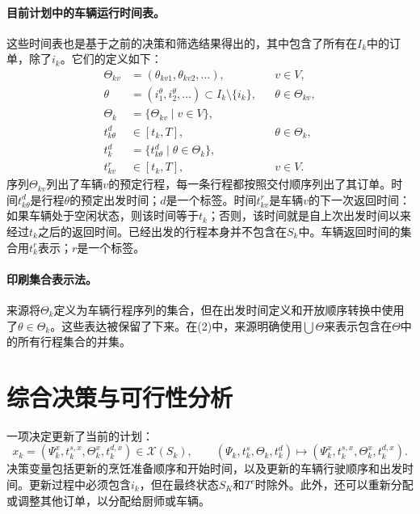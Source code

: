 \documentclass{article}
\begin{document}
\paragraph{目前计划中的车辆运行时间表。}
这些时间表也是基于之前的决策和筛选结果得出的，其中包含了所有在\(I_k\)中的订单，除了\(i_k\)。它们的定义如下：
\begin{align*}
\Theta_{kv}&=(\theta_{kv1},\theta_{kv2},\ldots), &&v\in V,\\
\theta&=(i^\theta_1,i^\theta_2,\ldots)\subset I_k\setminus\{i_k\}, &&\theta\in\Theta_{kv},\\
\Theta_k&=\{\Theta_{kv}\mid v\in V\},\\
t^d_{k\theta}&\in[t_k,T], &&\theta\in\Theta_k,\\
t^d_k&=\{t^d_{k\theta}\mid\theta\in\Theta_k\},\\
t^r_{kv}&\in[t_k,T], &&v\in V.
\end{align*}
序列\(\Theta_{kv}\)列出了车辆\(v\)的预定行程，每一条行程都按照交付顺序列出了其订单。时间\(t^d_{k\theta}\)是行程\(\theta\)的预定出发时间；\(d\)是一个标签。时间\(t^r_{kv}\)是车辆\(v\)的下一次返回时间：如果车辆处于空闲状态，则该时间等于\(t_k\)；否则，该时间就是自上次出发时间以来经过\(t_k\)之后的返回时间。已经出发的行程本身并不包含在\(S_k\)中。车辆返回时间的集合用\(t^r_k\)表示；\(r\)是一个标签。

\paragraph{印刷集合表示法。}
来源将\(\Theta_k\)定义为车辆行程序列的集合，但在出发时间定义和开放顺序转换中使用了\(\theta\in\Theta_k\)。这些表达被保留了下来。在(2)中，来源明确使用\(\bigcup\Theta\)来表示包含在\(\Theta\)中的所有行程集合的并集。

\section*{综合决策与可行性分析}

一项决定更新了当前的计划：
\[
x_k=(\Psi^x_k,t^{s,x}_k,\Theta^x_k,t^{d,x}_k)
\in\mathcal{X}(S_k),
\qquad
(\Psi_k,t^s_k,\Theta_k,t^d_k)
\longmapsto
(\Psi^x_k,t^{s,x}_k,\Theta^x_k,t^{d,x}_k).
\]
决策变量包括更新的烹饪准备顺序和开始时间，以及更新的车辆行驶顺序和出发时间。更新过程中必须包含\(i_k\)，但在最终状态\(S_K\)和\(T^c\)时除外。此外，还可以重新分配或调整其他订单，以分配给厨师或车辆。
\end{document}
